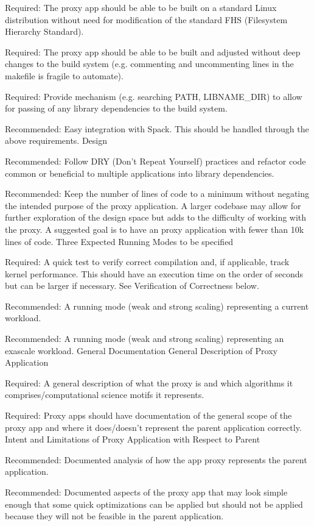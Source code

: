 Required: The proxy app should be able to be built on a standard Linux distribution without need for modification of the standard FHS (Filesystem Hierarchy Standard).

Required: The proxy app should be able to be built and adjusted without deep changes to the build system (e.g. commenting and uncommenting lines in the makefile is fragile to automate).

Required: Provide mechanism (e.g. searching PATH, LIBNAME_DIR) to allow for passing of any library dependencies to the build system.

Recommended: Easy integration with Spack. This should be handled through the above requirements.
Design

Recommended: Follow DRY (Don’t Repeat Yourself) practices and refactor code common or beneficial to multiple applications into library dependencies.

Recommended: Keep the number of lines of code to a minimum without negating the intended purpose of the proxy application. A larger codebase may allow for further exploration of the design space but adds to the difficulty of working with the proxy. A suggested goal is to have an proxy application with fewer than 10k lines of code.
Three Expected Running Modes to be specified

Required: A quick test to verify correct compilation and, if applicable, track kernel performance. This should have an execution time on the order of seconds but can be larger if necessary. See Verification of Correctness below.

Recommended: A running mode (weak and strong scaling) representing a current workload.

Recommended: A running mode (weak and strong scaling) representing an exascale workload.
General Documentation
General Description of Proxy Application

Required: A general description of what the proxy is and which algorithms it comprises/computational science motifs it represents.

Required: Proxy apps should have documentation of the general scope of the proxy app and where it does/doesn’t represent the parent application correctly.
Intent and Limitations of Proxy Application with Respect to Parent

Recommended: Documented analysis of how the app proxy represents the parent application.

Recommended: Documented aspects of the proxy app that may look simple enough that some quick optimizations can be applied but should not be applied because they will not be feasible in the parent application.

